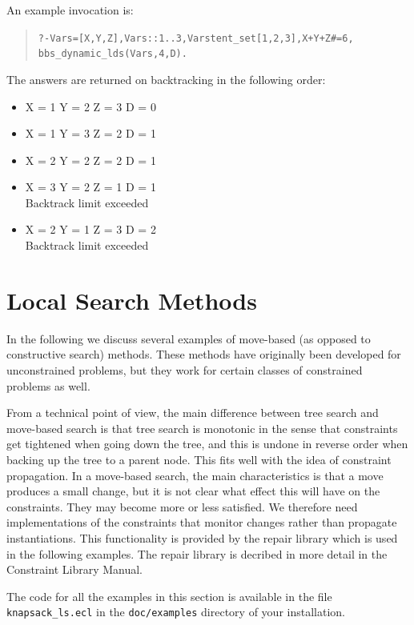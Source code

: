 An example invocation is:
\begin{quote}\begin{alltt}
?- Vars=[X,Y,Z], Vars::1..3, Vars tent_set [1,2,3], X+Y+Z#=6,
   bbs_dynamic_lds(Vars,4,D).
\end{alltt}\end{quote}
The answers are returned on backtracking in the following order:
\begin{itemize}
\item
X = 1
Y = 2
Z = 3
D = 0   
\item
X = 1
Y = 3
Z = 2
D = 1   
\item
X = 2
Y = 2
Z = 2
D = 1   
\item
X = 3
Y = 2
Z = 1
D = 1   \\
Backtrack limit exceeded
\item
X = 2
Y = 1
Z = 3
D = 2 \\
Backtrack limit exceeded
\end{itemize}

\section{Local Search Methods}

In the following we discuss several examples of move-based (as opposed
to constructive search) methods. These methods have originally been developed
for unconstrained problems, but they work for certain classes of
constrained problems as well.

From a technical point of view, the main difference between tree search
and move-based search is that tree search is monotonic in the sense that
constraints get tightened when going down the tree, and this is undone
in reverse order when backing up the tree to a parent node. This fits
well with the idea of constraint propagation.
In a move-based search, the main characteristics is that a move produces
a small change, but it is not clear what effect this will have on the
constraints. They may become more or less satisfied.
We therefore need implementations of the constraints that monitor changes
rather than propagate instantiations. This functionality is provided by
the {\eclipse} repair library which is used in the following examples.
The repair library is decribed in more detail in the
{\eclipse} Constraint Library Manual.
 
The {\eclipse} code for all the examples in this section is available
in the file {\tt knapsack_ls.ecl} in the {\tt doc/examples} directory of your
{\eclipse} installation.

